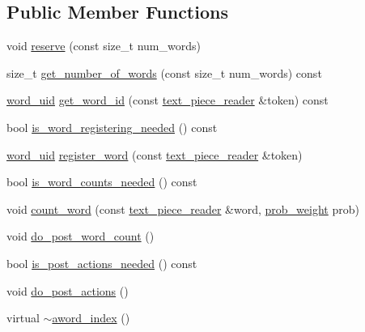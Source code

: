 \subsection*{Public Member Functions}
\begin{DoxyCompactItemize}
\item 
void \hyperlink{classuva_1_1smt_1_1bpbd_1_1server_1_1lm_1_1dictionary_1_1aword__index_a7d7be9ae362d430168ffee3e5ee29d19}{reserve} (const size\+\_\+t num\+\_\+words)
\item 
size\+\_\+t \hyperlink{classuva_1_1smt_1_1bpbd_1_1server_1_1lm_1_1dictionary_1_1aword__index_a2cd9869585cb021307aeac99f4a3c4b0}{get\+\_\+number\+\_\+of\+\_\+words} (const size\+\_\+t num\+\_\+words) const 
\item 
\hyperlink{namespaceuva_1_1smt_1_1bpbd_1_1server_a6bfe45ba344d65a7fdd7d26156328ddc}{word\+\_\+uid} \hyperlink{classuva_1_1smt_1_1bpbd_1_1server_1_1lm_1_1dictionary_1_1aword__index_a70b2789b3772e5528f0c139197e9d4ef}{get\+\_\+word\+\_\+id} (const \hyperlink{classuva_1_1utils_1_1file_1_1text__piece__reader}{text\+\_\+piece\+\_\+reader} \&token) const 
\item 
bool \hyperlink{classuva_1_1smt_1_1bpbd_1_1server_1_1lm_1_1dictionary_1_1aword__index_a9e7b2c33607674f174e9847d3c84a8ae}{is\+\_\+word\+\_\+registering\+\_\+needed} () const 
\item 
\hyperlink{namespaceuva_1_1smt_1_1bpbd_1_1server_a6bfe45ba344d65a7fdd7d26156328ddc}{word\+\_\+uid} \hyperlink{classuva_1_1smt_1_1bpbd_1_1server_1_1lm_1_1dictionary_1_1aword__index_ac9c84ca180a3edf7f81f2c3a06463582}{register\+\_\+word} (const \hyperlink{classuva_1_1utils_1_1file_1_1text__piece__reader}{text\+\_\+piece\+\_\+reader} \&token)
\item 
bool \hyperlink{classuva_1_1smt_1_1bpbd_1_1server_1_1lm_1_1dictionary_1_1aword__index_a9daa2e0472ae75f8747810a1a9165bce}{is\+\_\+word\+\_\+counts\+\_\+needed} () const 
\item 
void \hyperlink{classuva_1_1smt_1_1bpbd_1_1server_1_1lm_1_1dictionary_1_1aword__index_a38a128ba030fe3cbc5898d376facd922}{count\+\_\+word} (const \hyperlink{classuva_1_1utils_1_1file_1_1text__piece__reader}{text\+\_\+piece\+\_\+reader} \&word, \hyperlink{namespaceuva_1_1smt_1_1bpbd_1_1server_a01e9ea4de9c226f4464862e84ff0bbcc}{prob\+\_\+weight} prob)
\item 
void \hyperlink{classuva_1_1smt_1_1bpbd_1_1server_1_1lm_1_1dictionary_1_1aword__index_a9aa515706b0bdd2162aeabb61a38011d}{do\+\_\+post\+\_\+word\+\_\+count} ()
\item 
bool \hyperlink{classuva_1_1smt_1_1bpbd_1_1server_1_1lm_1_1dictionary_1_1aword__index_a3966d5e5839c475942276384b4d527af}{is\+\_\+post\+\_\+actions\+\_\+needed} () const 
\item 
void \hyperlink{classuva_1_1smt_1_1bpbd_1_1server_1_1lm_1_1dictionary_1_1aword__index_a43c16e38c7aa218b08bb548e7531c3bd}{do\+\_\+post\+\_\+actions} ()
\item 
virtual \hyperlink{classuva_1_1smt_1_1bpbd_1_1server_1_1lm_1_1dictionary_1_1aword__index_af71a1227aeb8a4b2b013c0006732d1fb}{$\sim$aword\+\_\+index} ()
\end{DoxyCompactItemize}

